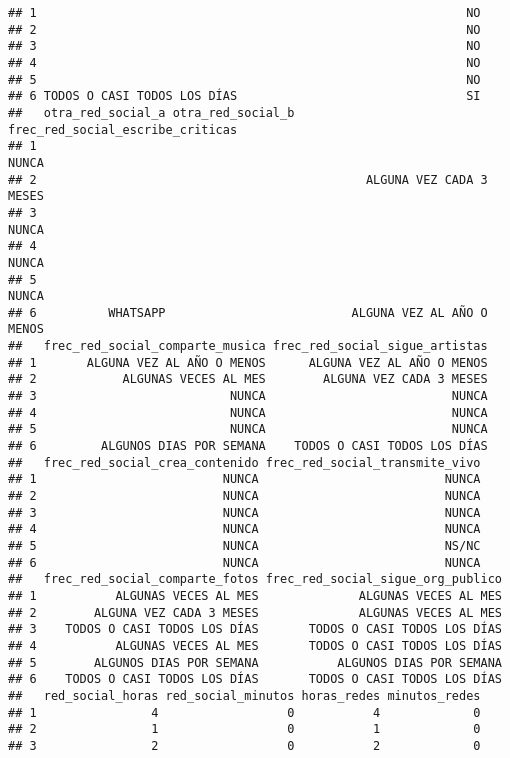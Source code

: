 \documentclass[
]{article}
\begin{document}
\begin{verbatim}
## 1                                                            NO
## 2                                                            NO
## 3                                                            NO
## 4                                                            NO
## 5                                                            NO
## 6 TODOS O CASI TODOS LOS DÍAS                                SI
##   otra_red_social_a otra_red_social_b frec_red_social_escribe_criticas
## 1                                                                NUNCA
## 2                                              ALGUNA VEZ CADA 3 MESES
## 3                                                                NUNCA
## 4                                                                NUNCA
## 5                                                                NUNCA
## 6          WHATSAPP                          ALGUNA VEZ AL AÑO O MENOS
##   frec_red_social_comparte_musica frec_red_social_sigue_artistas
## 1       ALGUNA VEZ AL AÑO O MENOS      ALGUNA VEZ AL AÑO O MENOS
## 2            ALGUNAS VECES AL MES        ALGUNA VEZ CADA 3 MESES
## 3                           NUNCA                          NUNCA
## 4                           NUNCA                          NUNCA
## 5                           NUNCA                          NUNCA
## 6         ALGUNOS DIAS POR SEMANA    TODOS O CASI TODOS LOS DÍAS
##   frec_red_social_crea_contenido frec_red_social_transmite_vivo
## 1                          NUNCA                          NUNCA
## 2                          NUNCA                          NUNCA
## 3                          NUNCA                          NUNCA
## 4                          NUNCA                          NUNCA
## 5                          NUNCA                          NS/NC
## 6                          NUNCA                          NUNCA
##   frec_red_social_comparte_fotos frec_red_social_sigue_org_publico
## 1           ALGUNAS VECES AL MES              ALGUNAS VECES AL MES
## 2        ALGUNA VEZ CADA 3 MESES              ALGUNAS VECES AL MES
## 3    TODOS O CASI TODOS LOS DÍAS       TODOS O CASI TODOS LOS DÍAS
## 4           ALGUNAS VECES AL MES       TODOS O CASI TODOS LOS DÍAS
## 5        ALGUNOS DIAS POR SEMANA           ALGUNOS DIAS POR SEMANA
## 6    TODOS O CASI TODOS LOS DÍAS       TODOS O CASI TODOS LOS DÍAS
##   red_social_horas red_social_minutos horas_redes minutos_redes
## 1                4                  0           4             0
## 2                1                  0           1             0
## 3                2                  0           2             0

\end{verbatim}
\end{document}

